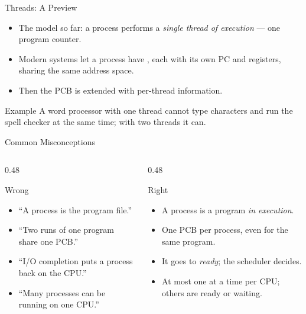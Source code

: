 \documentclass[aspectratio=169]{beamer}
\begin{document}

\begin{frame}{Threads: A Preview}
  \begin{itemize}
    \item The model so far: a process performs a \emph{single thread of
      execution} --- one program counter.
    \item Modern systems let a process have , each with
      its own PC and registers, sharing the same address space.
    \item Then the PCB is extended with per-thread information.
  \end{itemize}
  \vspace{0.2cm}
  \begin{exampleblock}{Example}
    A word processor with one thread cannot type characters and run the spell
    checker at the same time; with two threads it can.
  \end{exampleblock}
\end{frame}

\begin{frame}{Common Misconceptions}
  \begin{columns}[T]
    \begin{column}{0.48\textwidth}
      \begin{block}{Wrong}
        \begin{itemize}
          \item ``A process is the program file.''
          \item ``Two runs of one program share one PCB.''
          \item ``I/O completion puts a process back on the CPU.''
          \item ``Many processes can be running on one CPU.''
        \end{itemize}
      \end{block}
    \end{column}
    \begin{column}{0.48\textwidth}
      \begin{block}{Right}
        \begin{itemize}
          \item A process is a program \emph{in execution}.
          \item One PCB per process, even for the same program.
          \item It goes to \emph{ready}; the scheduler decides.
          \item At most one at a time per CPU; others are ready or waiting.
        \end{itemize}
      \end{block}
    \end{column}
  \end{columns}
\end{frame}
\end{document}

